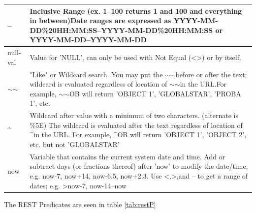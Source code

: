 \documentclass[12pt]{article}
\begin{document}
\begin{table}[H]
\begin{tabular}{|l|p{13.5cm}|}
		--                        & Inclusive Range (ex. 1--100 returns 1 and 100 and everything in between)Date ranges are expressed as YYYY-MM-DD\%20HH:MM:SS--YYYY-MM-DD\%20HH:MM:SS or YYYY-MM-DD--YYYY-MM-DD                                                                                                       \\ \hline
		null-val                  & Value for 'NULL', can only be used with Not Equal (\textless{}\textgreater{}) or by itself.                                                                                                                                                                                         \\ \hline
		$\sim$$\sim$              & "Like" or Wildcard search. You may put the $\sim$$\sim$before or after the text; wildcard is evaluated regardless of location of $\sim$$\sim$in the URL.For example, $\sim$$\sim$OB will return 'OBJECT 1', 'GLOBALSTAR', 'PROBA 1', etc.                                           \\ \hline
		\textasciicircum{}        & Wildcard after value with a minimum of two characters. (alternate is \%5E) The wildcard is evaluated after the text regardless of location of \textasciicircum in the URL. For example, \textasciicircum{}OB will return 'OBJECT 1', 'OBJECT 2', etc. but not 'GLOBALSTAR'           \\ \hline
		now                       & Variable that contains the current system date and time. Add or subtract days (or fractions thereof) after 'now' to modify the date/time, e.g. now-7, now+14, now-6.5, now+2.3. Use \textless{},\textgreater{},and -- to get a range of dates; e.g. \textgreater{}now-7, now-14--now \\ \hline
	\end{tabular}
\end{table}\doublespacing

The REST Predicates are seen in table \ref{tab:restP}
\end{document}
